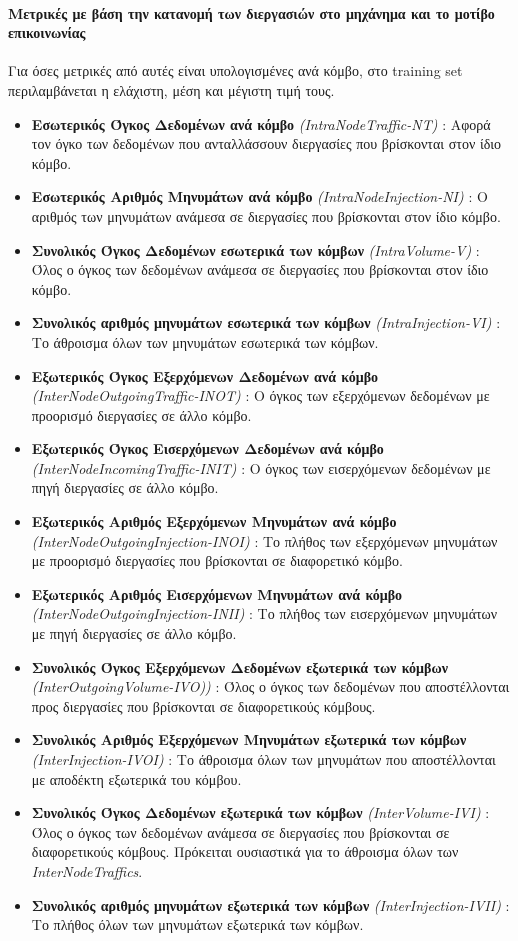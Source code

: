 \paragraph{Μετρικές με βάση την κατανομή των διεργασιών στο μηχάνημα και το μοτίβο επικοινωνίας\\}
Για όσες μετρικές από αυτές είναι υπολογισμένες ανά κόμβο, στο training set περιλαμβάνεται η ελάχιστη, μέση και μέγιστη τιμή τους.
\begin{itemize}
\item \textbf{Εσωτερικός Όγκος Δεδομένων ανά κόμβο} \textit{(Intra\-ΝodeΤraffic-NT)} : Αφορά τον όγκο των δεδομένων που ανταλλάσσουν διεργασίες που βρίσκονται στον ίδιο κόμβο. 
\item \textbf{Εσωτερικός Αριθμός Μηνυμάτων ανά κόμβο} \textit{(Intra\-ΝodeΙnjection-NI)} : Ο αριθμός των μηνυμάτων ανάμεσα σε διεργασίες που βρίσκονται στον ίδιο κόμβο.
\item \textbf{Συνολικός Όγκος Δεδομένων εσωτερικά των κόμβων} \textit{(Intra\-Volume-V)} : Όλος ο όγκος των δεδομένων ανάμεσα σε διεργασίες που βρίσκονται στον ίδιο κόμβο. 
\item \textbf{Συνολικός αριθμός μηνυμάτων εσωτερικά των κόμβων} \textit{(Intra\-Injection-VI)} : Το άθροισμα όλων των μηνυμάτων εσωτερικά των κόμβων. 
\item \textbf{Εξωτερικός Όγκος Εξερχόμενων Δεδομένων ανά κόμβο} \textit{(Inter\-NodeOutgoingTraffic-INOT)} : Ο όγκος των εξερχόμενων δεδομένων με προορισμό διεργασίες σε άλλο κόμβο. 
\item \textbf{Εξωτερικός Όγκος Εισερχόμενων Δεδομένων ανά κόμβο} \textit{(Inter\-NodeIncomingTraffic-INIT)} : Ο όγκος των εισερχόμενων δεδομένων με πηγή διεργασίες σε άλλο κόμβο.
\item \textbf{Εξωτερικός Αριθμός Εξερχόμενων Μηνυμάτων  ανά κόμβο} \textit{(Inter\-ΝodeOutgoingΙnjection-INOI)} : Το πλήθος των εξερχόμενων μηνυμάτων με προορισμό διεργασίες που βρίσκονται σε διαφορετικό κόμβο.
\item \textbf{Εξωτερικός Αριθμός Εισερχόμενων Μηνυμάτων  ανά κόμβο} \textit{(Inter\-ΝodeOutgoingΙnjection-INΙI)} : Το πλήθος των εισερχόμενων μηνυμάτων με πηγή διεργασίες σε άλλο κόμβο.
\item \textbf{Συνολικός Όγκος Εξερχόμενων Δεδομένων εξωτερικά των κόμβων} \textit{(Int\-erOutgoingVolume-IVO))} : Όλος ο όγκος των δεδομένων που αποστέλλονται προς διεργασίες που βρίσκονται σε διαφορετικούς κόμβους. 
\item \textbf{Συνολικός Αριθμός  Εξερχόμενων Μηνυμάτων εξωτερικά των κόμβων} \textit{(Int\-erInjection-IVOI)} : Το άθροισμα όλων των μηνυμάτων που αποστέλλονται με αποδέκτη εξωτερικά του κόμβου.
\item \textbf{Συνολικός Όγκος Δεδομένων εξωτερικά των κόμβων} \textit{(Int\-erVolume-IVI)} : Όλος ο όγκος των δεδομένων ανάμεσα σε διεργασίες που βρίσκονται σε διαφορετικούς κόμβους. Πρόκειται ουσιαστικά για το άθροισμα όλων των \textit{InterNodeTraffics}.
\item \textbf{Συνολικός αριθμός μηνυμάτων εξωτερικά των κόμβων} \textit{(Int\-erInjection-IVII)} : Το πλήθος όλων των μηνυμάτων εξωτερικά των κόμβων. 
\end{itemize}
